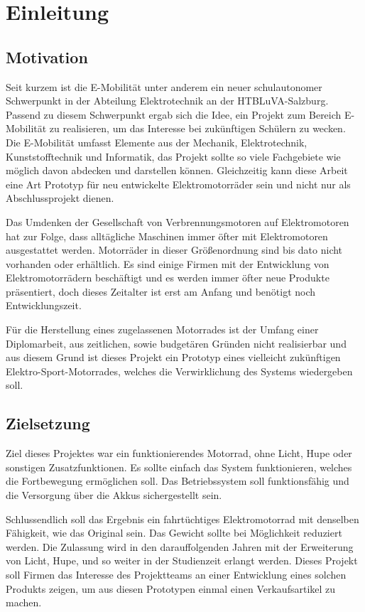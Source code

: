 \chapter{Einleitung}

\section{Motivation}
Seit kurzem ist die E-Mobilität unter anderem ein neuer schulautonomer Schwerpunkt in der Abteilung Elektrotechnik an der HTBLuVA-Salzburg. Passend zu diesem Schwerpunkt ergab sich die Idee, ein Projekt zum Bereich E-Mobilität zu realisieren, um das Interesse bei zukünftigen Schülern zu wecken.
Die E-Mobilität umfasst Elemente aus der Mechanik, Elektrotechnik, Kunststofftechnik und Informatik, das Projekt sollte so viele Fachgebiete wie möglich davon abdecken und darstellen können. Gleichzeitig kann diese Arbeit eine Art Prototyp für neu entwickelte Elektromotorräder sein und nicht nur als Abschlussprojekt dienen.

Das Umdenken der Gesellschaft von Verbrennungsmotoren auf Elektromotoren hat zur Folge, dass alltägliche Maschinen immer öfter mit Elektromotoren ausgestattet werden. Motorräder in dieser Größenordnung sind bis dato nicht vorhanden oder erhältlich. Es sind einige Firmen mit der Entwicklung von Elektromotorrädern beschäftigt und es werden immer öfter neue Produkte präsentiert, doch dieses Zeitalter ist erst am Anfang und benötigt noch Entwicklungszeit.

Für die Herstellung eines zugelassenen Motorrades ist der Umfang einer Diplomarbeit, aus zeitlichen, sowie budgetären Gründen nicht realisierbar und aus diesem Grund ist dieses Projekt ein Prototyp eines vielleicht zukünftigen Elektro-Sport-Motorrades, welches die Verwirklichung des Systems wiedergeben soll.

\section{Zielsetzung}
Ziel dieses Projektes war ein funktionierendes Motorrad, ohne Licht, Hupe oder sonstigen Zusatzfunktionen. Es sollte einfach das System funktionieren, welches die Fortbewegung ermöglichen soll. Das Betriebssystem soll funktionsfähig und die Versorgung über die Akkus sichergestellt sein. 

Schlussendlich soll das Ergebnis ein fahrtüchtiges Elektromotorrad mit denselben Fähigkeit, wie das Original sein. Das Gewicht sollte bei Möglichkeit reduziert werden. Die Zulassung wird in den darauffolgenden Jahren mit der Erweiterung von Licht, Hupe, und so weiter in der Studienzeit erlangt werden. Dieses Projekt soll Firmen das Interesse des Projektteams an einer Entwicklung eines solchen Produkts zeigen, um aus diesen Prototypen einmal einen Verkaufsartikel zu machen.

